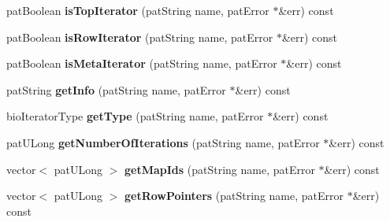 \begin{DoxyCompactItemize}
\mbox{\label{classbio_iterator_info_repository_ac67b7d18433902be8c8c31fd717513e8}} 
pat\+Boolean {\bfseries is\+Top\+Iterator} (pat\+String name, pat\+Error $\ast$\&err) const
\item 
\mbox{\label{classbio_iterator_info_repository_a0d45d6689685f05420b65350aff28883}} 
pat\+Boolean {\bfseries is\+Row\+Iterator} (pat\+String name, pat\+Error $\ast$\&err) const
\item 
\mbox{\label{classbio_iterator_info_repository_ac615393c44b04a7c7d50a2f0fa98648f}} 
pat\+Boolean {\bfseries is\+Meta\+Iterator} (pat\+String name, pat\+Error $\ast$\&err) const
\item 
\mbox{\label{classbio_iterator_info_repository_ae71b285653402fef8705b013ccb67d56}} 
pat\+String {\bfseries get\+Info} (pat\+String name, pat\+Error $\ast$\&err) const
\item 
\mbox{\label{classbio_iterator_info_repository_ad25a5837033e0907c64161db15186221}} 
bio\+Iterator\+Type {\bfseries get\+Type} (pat\+String name, pat\+Error $\ast$\&err) const
\item 
\mbox{\label{classbio_iterator_info_repository_aa9036ca7c883b1b1b15a0d6ffffb5e86}} 
pat\+U\+Long {\bfseries get\+Number\+Of\+Iterations} (pat\+String name, pat\+Error $\ast$\&err) const
\item 
\mbox{\label{classbio_iterator_info_repository_ac9ec515a074ac61e9ac78f6922f1cae5}} 
vector$<$ pat\+U\+Long $>$ {\bfseries get\+Map\+Ids} (pat\+String name, pat\+Error $\ast$\&err) const
\item 
\mbox{\label{classbio_iterator_info_repository_a3be873cc08e32c015e884c6d7833fc9a}} 
vector$<$ pat\+U\+Long $>$ {\bfseries get\+Row\+Pointers} (pat\+String name, pat\+Error $\ast$\&err) const
\item 
\mbox{\label{classbio_iterator_info_repository_a82c338c535847628c84ce5dd4cce7bd2}} 

\end{DoxyCompactItemize}
